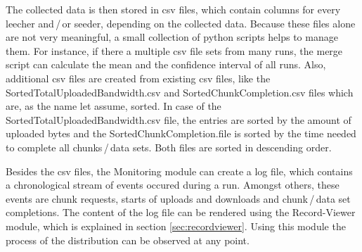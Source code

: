 The collected data is then stored in csv files, which contain columns for every leecher and\,/\,or seeder, depending on the collected data. Because these files alone are not very meaningful, a small collection of python scripts helps to manage them. For instance, if there a multiple csv file sets from many runs, the merge script can calculate the mean and the confidence interval of all runs. Also, additional csv files are created from existing csv files, like the SortedTotalUploadedBandwidth.csv and SortedChunkCompletion.csv files which are, as the name let assume, sorted. In case of the SortedTotalUploadedBandwidth.csv file, the entries are sorted by the amount of uploaded bytes and the SortedChunkCompletion.file is sorted by the time needed to complete all chunks\,/\,data sets. Both files are sorted in descending order.

Besides the csv files, the Monitoring module can create a log file, which contains a chronological stream of events occured during a run. Amongst others, these events are chunk requests, starts of uploads and downloads and chunk\,/\,data set completions. The content of the log file can be rendered using the Record-Viewer module, which is explained in section \ref{sec:recordviewer}. Using this module the process of the distribution can be observed at any point.
